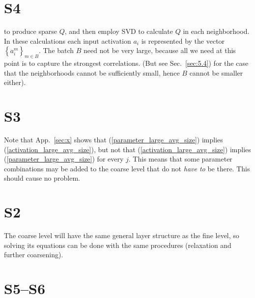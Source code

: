 \documentclass{article} %
\begin{document}
\section{S4}
to produce sparse $Q$, and then employ SVD to calculate $Q$ in each neighborhood. In these calculations each input activation $a_i$ is represented by the vector $\left\{ a^m_i \right\}_{m \in B}$. The batch $B$ need not be very large, because all we need at this point is to capture the strongest correlations. (But see Sec.~\ref{sec:5.4}) for the case that the neighborhoods cannot be sufficiently small, hence $B$ cannot be smaller either).

\section{S3}
Note that App.~\ref{sec:x} shows that (\ref{parameter_large_avg_size}) implies (\ref{activation_large_avg_size}), but not that (\ref{activation_large_avg_size}) implies (\ref{parameter_large_avg_size}) for every $j$. This means that some parameter combinations may be added to the coarse level that do not {\it have to} be there. This should cause no problem.

\section{S2}
The coarse level will have the same general layer structure as the fine level, so solving its equations can be done with the same procedures (relaxation and further coarsening).

\section{S5--S6}
\end{document}
